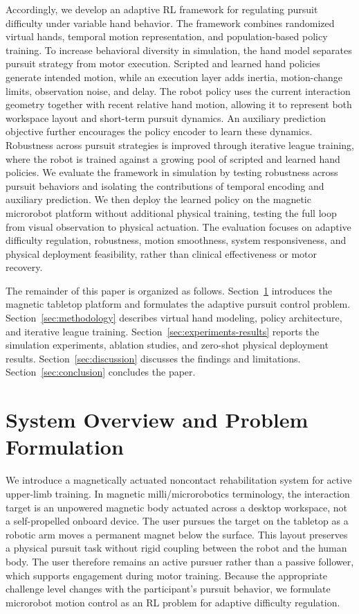 \documentclass[journal,twoside,web]{ieeecolor2}
\begin{document}
Accordingly, we develop an adaptive RL framework for regulating pursuit difficulty under variable hand behavior. The framework combines randomized virtual hands, temporal motion representation, and population-based policy training. To increase behavioral diversity in simulation, the hand model separates pursuit strategy from motor execution. Scripted and learned hand policies generate intended motion, while an execution layer adds inertia, motion-change limits, observation noise, and delay. The robot policy uses the current interaction geometry together with recent relative hand motion, allowing it to represent both workspace layout and short-term pursuit dynamics. An auxiliary prediction objective further encourages the policy encoder to learn these dynamics. Robustness across pursuit strategies is improved through iterative league training, where the robot is trained against a growing pool of scripted and learned hand policies. We evaluate the framework in simulation by testing robustness across pursuit behaviors and isolating the contributions of temporal encoding and auxiliary prediction. We then deploy the learned policy on the magnetic microrobot platform without additional physical training, testing the full loop from visual observation to physical actuation. The evaluation focuses on adaptive difficulty regulation, robustness, motion smoothness, system responsiveness, and physical deployment feasibility, rather than clinical effectiveness or motor recovery.

The remainder of this paper is organized as follows. Section~\ref{sec:system-overview} introduces the magnetic tabletop platform and formulates the adaptive pursuit control problem. Section~\ref{sec:methodology} describes virtual hand modeling, policy architecture, and iterative league training. Section~\ref{sec:experiments-results} reports the simulation experiments, ablation studies, and zero-shot physical deployment results. Section~\ref{sec:discussion} discusses the findings and limitations. Section~\ref{sec:conclusion} concludes the paper.

\section{System Overview and Problem Formulation}
\label{sec:system-overview}
We introduce a magnetically actuated noncontact rehabilitation system for active upper-limb training. In magnetic milli/microrobotics terminology, the interaction target is an unpowered magnetic body actuated across a desktop workspace, not a self-propelled onboard device. The user pursues the target on the tabletop as a robotic arm moves a permanent magnet below the surface. This layout preserves a physical pursuit task without rigid coupling between the robot and the human body. The user therefore remains an active pursuer rather than a passive follower, which supports engagement during motor training. Because the appropriate challenge level changes with the participant's pursuit behavior, we formulate microrobot motion control as an RL problem for adaptive difficulty regulation.
\end{document}
